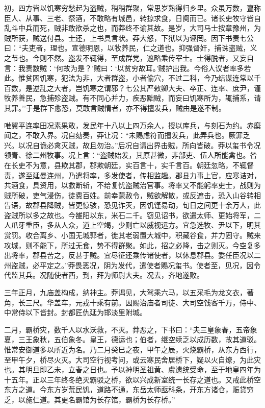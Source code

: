 \documentclass[]{article}
\begin{document}
初，四方皆以饥寒穷愁起为盗贼，稍稍群聚，常思岁熟得归乡里。众虽万数，亶称臣人、从事、三老、祭酒，不敢略有城邑，转掠求食，日阕而已。诸长吏牧守皆自乱斗中兵而死，贼非敢欲杀之也，而莽终不谕其故。是岁，大司马士按章豫州，为贼所获，贼送付县。士还，上书具言状。莽大怒，下狱以为诬罔。因下书责七公曰：``夫吏者，理也。宣德明恩，以牧养民，仁之道也。抑强督奸，捕诛盗贼，义之节也。今则不然。盗发不辄得，至成群党，遮略乘传宰士。士得脱者，又妄自言：我责数贼：`何故为是？'贼曰：`以贫穷故耳。'贼护出我。今俗人议者率多若此。惟贫困饥寒，犯法为非，大者群盗，小者偷穴，不过二科，今乃结谋连常以千百数，是逆乱之大者，岂饥寒之谓邪？七公其严敕卿大夫、卒正、连率、庶尹，谨牧养善民，急捕殄盗贼。有不同心并力，疾恶黜贼，而妄曰饥寒所为，辄捕系，请其罪。''于是群下愈恐，莫敢言贼情者，亦不得擅发兵，贼由是遂不制。

唯翼平连率田况素果敢，发民年十八以上四万余人，授以库兵，与刻石为约。赤糜闻之，不敢入界。况自劾奏，莽让况：``未赐虑符而擅发兵，此弄兵也。厥罪乏兴。以况自诡必禽灭贼，故且勿治。''后况自请出界击贼，所向皆破。莽以玺书令况领青、徐二州牧事。况上言：``盗贼始发，其原甚微，非部吏、伍人所能禽也。咎在长吏不为意，县欺其郡，郡欺朝廷，实百言十，实千言百。朝廷忽略，不辄督责，遂至延曼连州，乃遣将率，多发使者，传相监趣。郡县力事上官，应寒诘对，共酒食，具资用，以救断斩，不给复忧盗贼治官事。将率又不能躬率吏士，战则为贼所破，吏气浸伤，徒费百姓。前幸蒙赦令，贼欲解散，或反遮击，恐入山谷转相告语，故郡县降贼，皆更惊骇，恐见诈灭，因饥馑易动，旬日之间更十余万人，此盗贼所以多之故也。今雒阳以东，米石二千。窃见诏书，欲遣太师、更始将军，二人爪牙重臣，多从人众，道上空竭，少则亡以威视远方。宜急选牧、尹以下，明其赏罚。收合离乡、小国无城郭者，徙其老弱置大城中，积藏谷食，并力固守。贼来攻城，则不能下，所过无食，势不得群聚。如此，招之必降，击之则灭。今空复多出将率，郡县苦之，反甚于贼。宜尽征还乘传诸使者，以休息郡县。委任臣况以二州盗贼，必平定之。''莽畏恶况，阴为发代，遣使者赐况玺书。使者至，见况，因令代监其兵。况随使者西，到，拜为师尉大夫。况去，齐地遂败。

三年正月，九庙盖构成，纳神主。莽谒见，大驾乘六马，以五采毛为龙文衣，著角，长三尺。华盖车，元戎十乘有前。因赐治庙者司徒、大司空饯客千万，侍中、中常侍以下皆封。封都匠仇延为邯淡里附城。

二月，霸桥灾，数千人以水沃救，不灭。莽恶之，下书曰：``夫三皇象春，五帝象夏，三王象秋，五伯象冬。皇王，德运也；伯者，继空续乏以成历数，故其道驳。惟常安御道多以所近为名。乃二月癸巳之夜，甲午之辰，火烧霸桥，从东方西行，至甲午夕，桥尽火灭。大司空行视考问，或云寒民舍居桥下，疑以火自燎，为此灾也。其明旦即乙未，立春之日也。予以神明圣祖黄、虞遗统受命，至于地皇四年为十五年。正以三年终冬绝灭霸驳之桥，欲以兴成新室统一长存之道也。又戒此桥空东方之道。今东方岁荒民饥，道路不通，东岳太师亟科条，开东方诸仓，赈贷穷乏，以施仁道。其更名霸馆为长存馆，霸桥为长存桥。''
\end{document}
